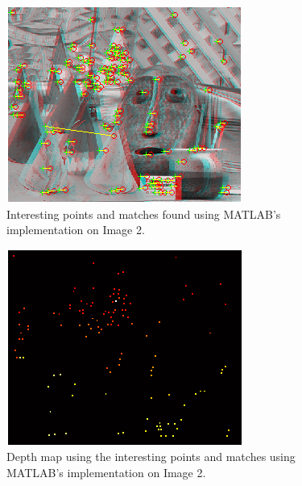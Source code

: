 \begin{figure}[H]\centering
	\includegraphics[width=0.8\linewidth]{Images/02_matlab_match.png}
	\caption{Interesting points and matches found using MATLAB's implementation on Image 2.}
	\label{fig:cones-matlab-match}
\end{figure}

\begin{figure}[H]\centering
	\includegraphics[width=0.8\linewidth]{Images/02_matlab_depth.png}
	\caption{Depth map using the interesting points and matches using MATLAB's implementation on Image 2.}
	\label{fig:cones-matlab-depth}
\end{figure}

